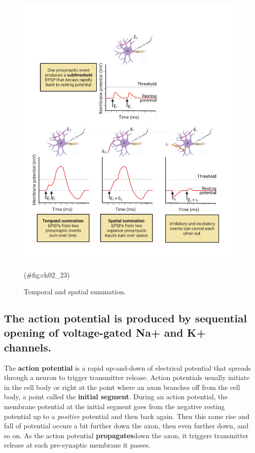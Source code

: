 \documentclass[
]{book}
\begin{document}
\begin{figure}

{\centering \includegraphics[width=0.8\linewidth]{images/ch02/02_23} 

}

\caption{Temporal and spatial summation.}(\#fig:ch02_23)
\end{figure}

\hypertarget{the-action-potential-is-produced-by-sequential-opening-of-voltage-gated-na-and-k-channels.}{%
\subsection{The action potential is produced by sequential opening of voltage-gated Na+ and K+ channels.}\label{the-action-potential-is-produced-by-sequential-opening-of-voltage-gated-na-and-k-channels.}}

The \textbf{action potential} is a rapid up-and-down of electrical potential that spreads through a neuron to trigger transmitter release. Action potentials usually initiate in the cell body or right at the point where an axon branches off from the cell body, a point called the \textbf{initial segment}. During an action potential, the membrane potential at the initial segment goes from the negative resting potential up to a \emph{positive} potential and then back again. Then this same rise and fall of potential occurs a bit further down the axon, then even further down, and so on. As the action potential \textbf{propagates}down the axon, it triggers transmitter release at each pre-synaptic membrane it passes.
\end{document}
